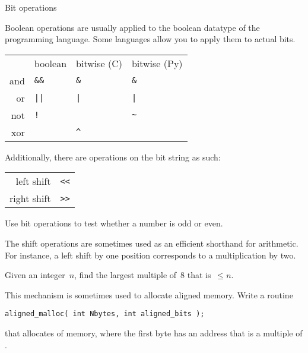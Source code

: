  {Bit operations}

Boolean operations are usually applied to the boolean datatype of the
programming language. Some languages allow you to apply them to actual
bits.

\begin{tabular}{rlll}
  \toprule
  &boolean&bitwise (C)&bitwise (Py)\\
  and&\verb+&&+ & \verb+&+ & \verb+&+ \\
  or &\verb+||+ & \verb+|+ & \verb+|+ \\
  not&\verb+!+  &          & \verb+~+ \\
  xor&          & \verb+^+ &          \\
  \bottomrule
\end{tabular}

Additionally, there are operations on the bit string as such:

\begin{tabular}{rl}
  \toprule
  left  shift& \verb+<<+ \\
  right shift& \verb+>>+ \\
  \bottomrule
\end{tabular}

\begin{exercise}
  \label{tutex:bit-even}
  Use bit operations to test whether a number is odd or even.
\end{exercise}

The shift operations are sometimes used as an efficient shorthand for
arithmetic. For instance, a left shift by one position corresponds to
a multiplication by two.

\begin{exercise}
  \label{ex:malloc_align}
  Given an integer~$n$, find the largest multiple of~8 that is~$\leq
  n$.

  This mechanism is sometimes used to allocate aligned memory.
  Write a routine
\begin{verbatim}
aligned_malloc( int Nbytes, int aligned_bits );
\end{verbatim}
  that allocates  of memory, where the first byte has an
  address that is a multiple of .
\end{exercise}

